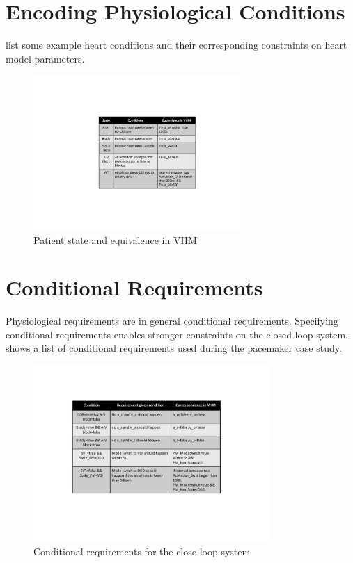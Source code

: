 \section{Encoding Physiological Conditions}
 list some example heart conditions and their corresponding constraints on heart model parameters.
\begin{figure}[!t]
	\center
	\includegraphics[width=0.70\textwidth]{figs/state.pdf}
	\center
	
	\caption{Patient state and equivalence in VHM}
	\label{fig:state}
\end{figure}
\section{Conditional Requirements}
Physiological requirements are in general conditional requirements. Specifying conditional requirements enables stronger constraints on the closed-loop system.  shows a list of conditional requirements used during the pacemaker case study. 
\begin{figure}[!b]
	\center
	\includegraphics[width=0.8\textwidth]{figs/conditional.pdf}
	\center
	\caption{Conditional requirements for the close-loop system}
	\label{fig:conditional}
\end{figure}
